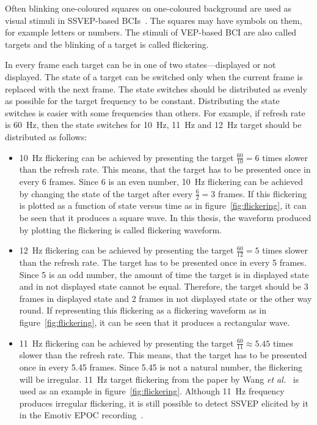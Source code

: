 Often blinking one-coloured squares on one-coloured background are used as visual stimuli in \gls{SSVEP}-based \glspl{BCI}~\cite{ssvep_stim}. The squares may have symbols on them, for example letters or numbers. The stimuli of \gls{VEP}-based \gls{BCI} are also called \glspl{target} and the blinking of a \gls{target} is called \gls{flickering}.

In every \gls{frame} each \gls{target} can be in one of two \glspl{state}---displayed or not displayed. The \gls{state} of a \gls{target} can be switched only when the current \gls{frame} is replaced with the next \gls{frame}. The \gls{state} switches should be distributed as evenly as possible for the \gls{target} frequency to be constant. Distributing the \gls{state} switches is easier with some frequencies than others. For example, if \gls{refresh rate} is \SI{60}{Hz}, then the state switches for \SI{10}{Hz}, \SI{11}{Hz} and \SI{12}{Hz} \gls{target} should be distributed as follows:
\begin{itemize}
	\item \SI{10}{Hz} \gls{flickering} can be achieved by presenting the \gls{target} $\frac{60}{10}=6$ times slower than the \gls{refresh rate}. This means, that the \gls{target} has to be presented once in every 6 \glspl{frame}. Since 6 is an even number, \SI{10}{Hz} \gls{flickering} can be achieved by changing the \gls{state} of the \gls{target} after every $\frac{6}{2} = 3$ \glspl{frame}. If this \gls{flickering} is plotted as a function of \gls{state} versus time as in figure~\ref{fig:flickering}, it can be seen that it produces a \gls{square wave}. In this thesis, the waveform produced by plotting the \gls{flickering} is called \gls{flickering waveform}.
	\item \SI{12}{Hz} \gls{flickering} can be achieved by presenting the \gls{target} $\frac{60}{12}=5$ times slower than the \gls{refresh rate}. The \gls{target} has to be presented once in every 5 \glspl{frame}. Since 5 is an odd number, the amount of time the \gls{target} is in displayed \gls{state} and in not displayed \gls{state} cannot be equal. Therefore, the \gls{target} should be 3 \glspl{frame} in displayed \gls{state} and 2 \glspl{frame} in not displayed \gls{state} or the other way round. If representing this \gls{flickering} as a \gls{flickering waveform} as in figure~\ref{fig:flickering}, it can be seen that it produces a \gls{rectangular wave}.
	\item \SI{11}{Hz} \gls{flickering} can be achieved by presenting the \gls{target} $\frac{60}{11}\approx 5.45$ times slower than the \gls{refresh rate}. This means, that the \gls{target} has to be presented once in every 5.45 \glspl{frame}. Since 5.45 is not a natural number, the \gls{flickering} will be irregular. \SI{11}{Hz} target \gls{flickering} from the paper by Wang \textit{et al.}~\cite{11hz} is used as an example in figure~\ref{fig:flickering}. Although \SI{11}{Hz} frequency produces irregular \gls{flickering}, it is still possible to detect \gls{SSVEP} elicited by it in the Emotiv EPOC recording~\cite{emotiv_11hz}.
\end{itemize}

